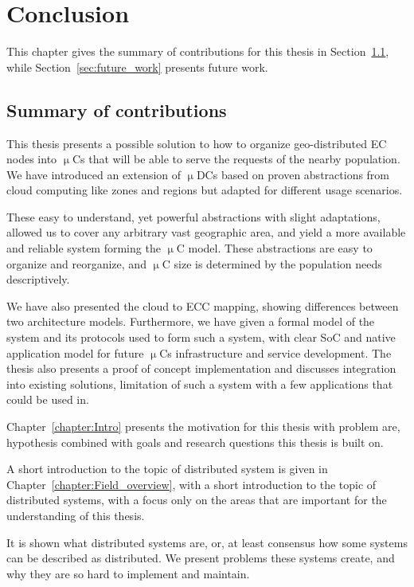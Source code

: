 \chapter{Conclusion}\label{chapter:Conclusion}
%
This chapter gives the summary of contributions for this thesis in Section~\ref{sec:summary_of_contributions}, while Section~\ref{sec:future_work} presents future work.
%
%
\section{Summary of contributions}\label{sec:summary_of_contributions}
%
This thesis presents a possible solution to how to organize geo-distributed EC nodes into $\upmu$Cs that will be able to serve the requests of the nearby population. We have introduced an extension of $\upmu$DCs based on proven abstractions from cloud computing like zones and regions but adapted for different usage scenarios.

These easy to understand, yet powerful abstractions with slight adaptations, allowed us to cover any arbitrary vast geographic area, and yield a more available and reliable system forming the $\upmu$C model. These abstractions are easy to organize and reorganize, and $\upmu$C size is determined by the population needs descriptively. 

We have also presented the cloud to ECC mapping, showing differences between two architecture models. Furthermore, we have given a formal model of the system and its protocols used to form such a system, with clear SoC and native application model for future $\upmu$Cs infrastructure and service development. The thesis also presents a proof of concept implementation and discusses integration into existing solutions, limitation of such a system with a few applications that could be used in.

Chapter~\ref{chapter:Intro} presents the motivation for this thesis with problem are, hypothesis combined with goals and research questions this thesis is built on.

A short introduction to the topic of distributed system is given in Chapter~\ref{chapter:Field_overview}, with a short introduction to the topic of distributed systems, with a focus only on the areas that are important for the understanding of this thesis. 

It is shown what distributed systems are, or, at least consensus how some systems can be described as distributed. We present problems these systems create, and why they are so hard to implement and maintain. 

